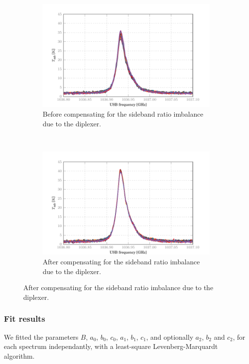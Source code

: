 \begin{figure}
        \centering
    \begin{subfigure}[b]{\textwidth}
        \includegraphics{diplexer_correction_no}
        \caption{Before compensating for the sideband ratio imbalance due to the diplexer.}
    \end{subfigure}
    \\
    \begin{subfigure}[b]{\textwidth}
        \includegraphics{diplexer_correction_yes}
        \caption{After compensating for the sideband ratio imbalance due to the diplexer.}
    \end{subfigure}
\end{figure}

\subsubsection{Fit results}
We fitted the parameters $B$, $a_0$, $b_0$, $c_0$, $a_1$, $b_1$, $c_1$, and optionally $a_2$, $b_2$ and $c_2$, for each spectrum independantly, with a least-square Levenberg-Marquardt algorithm.

